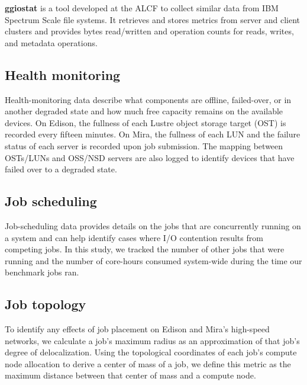 \label{sec:methods/ggiostat}
\textbf{ggiostat} is a tool developed at the ALCF to collect similar data from IBM Spectrum Scale file systems.
It retrieves and stores metrics from server and client clusters and provides bytes read/written and operation counts for reads, writes, and metadata operations.

\subsection{Health monitoring} \label{sec:methods/health}

Health-monitoring data describe what components are offline, failed-over, or in another degraded state and how much free capacity remains on the available devices.
On Edison, the fullness of each Lustre object storage target (OST) is recorded every fifteen minutes.  
On Mira, the fullness of each LUN and the failure status of each server is recorded upon job submission.
The mapping between OSTs/LUNs and OSS/NSD servers are also logged to identify devices that have failed over to a degraded state.

\subsection{Job scheduling} \label{sec:methods/scheduling}

Job-scheduling data provides details on the jobs that are concurrently running on a system and can help identify cases where I/O contention results from competing jobs.
In this study, we tracked the number of other jobs that were running and the number of core-hours consumed system-wide during the time our benchmark jobs ran.


\subsection{Job topology} \label{sec:methods/other}

To identify any effects of job placement on Edison and Mira's high-speed networks, we calculate a job's maximum radius as an approximation of that job's degree of delocalization.
Using the topological coordinates of each job's compute node allocation to derive a center of mass of a job, we define this metric as the maximum distance between that center of mass and a compute node.

